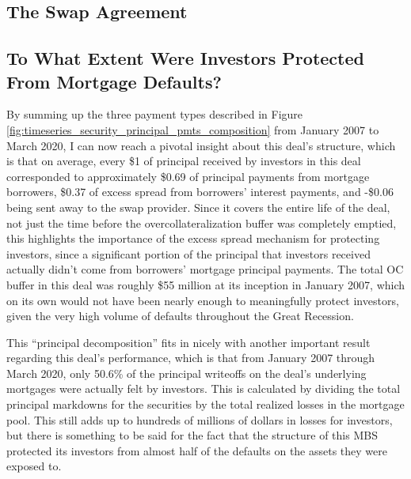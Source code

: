 \documentclass[12pt]{article}
\begin{document}
\subsection*{The Swap Agreement}

\subsection*{To What Extent Were Investors Protected From Mortgage Defaults?}

By summing up the three payment types described in Figure \ref{fig:timeseries_security_principal_pmts_composition} from January 2007 to March 2020, I can now reach a pivotal insight about this deal’s structure, which is that on average, every \$1 of principal received by investors in this deal corresponded to approximately \$0.69 of principal payments from mortgage borrowers, \$0.37 of excess spread from borrowers’ interest payments, and -\$0.06 being sent away to the swap provider. Since it covers the entire life of the deal, not just the time before the overcollateralization buffer was completely emptied, this highlights the importance of the excess spread mechanism for protecting investors, since a significant portion of the principal that investors received actually didn’t come from borrowers’ mortgage principal payments. The total OC buffer in this deal was roughly \$55 million at its inception in January 2007, which on its own would not have been nearly enough to meaningfully protect investors, given the very high volume of defaults throughout the Great Recession.

This “principal decomposition” fits in nicely with another important result regarding this deal’s performance, which is that from January 2007 through March 2020, only 50.6\% of the principal writeoffs on the deal’s underlying mortgages were actually felt by investors. This is calculated by dividing the total principal markdowns for the securities by the total realized losses in the mortgage pool. This still adds up to hundreds of millions of dollars in losses for investors, but there is something to be said for the fact that the structure of this MBS protected its investors from almost half of the defaults on the assets they were exposed to.
	
\end{document}

